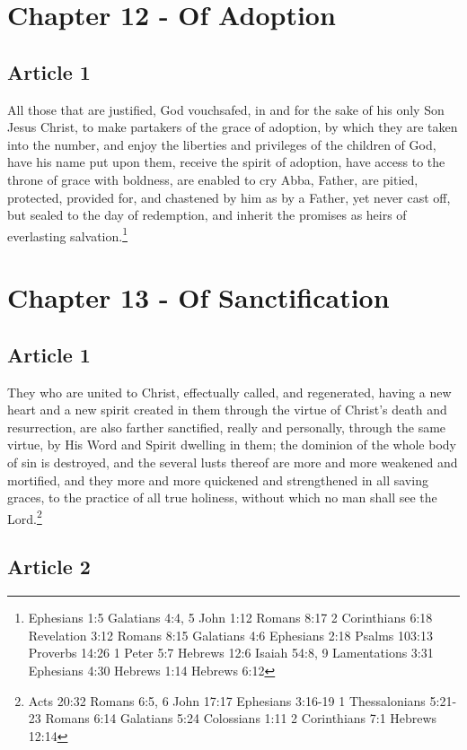 \documentclass[12pt,letterpaper]{book}
\begin{document}
\chapter{Chapter 12 - Of Adoption}
\section{Article 1}

All those that are justified, God vouchsafed, in and for the sake of his only Son Jesus Christ, to make partakers of the grace of adoption, by which they are taken into the number, and enjoy the liberties and privileges of the children of God, have his name put upon them, receive the spirit of adoption, have access to the throne of grace with boldness, are enabled to cry Abba, Father, are pitied, protected, provided for, and chastened by him as by a Father, yet never cast off, but sealed to the day of redemption, and inherit the promises as heirs of everlasting salvation.\footnote{Ephesians 1:5 Galatians 4:4, 5 John 1:12 Romans 8:17 2 Corinthians 6:18 Revelation 3:12 Romans 8:15 Galatians 4:6 Ephesians 2:18 Psalms 103:13 Proverbs 14:26 1 Peter 5:7 Hebrews 12:6 Isaiah 54:8, 9 Lamentations 3:31 Ephesians 4:30 Hebrews 1:14 Hebrews 6:12}

\chapter{Chapter 13 - Of Sanctification}
\section{Article 1}

They who are united to Christ, effectually called, and regenerated, having a new heart and a new spirit created in them through the virtue of Christ's death and resurrection, are also farther sanctified, really and personally, through the same virtue, by His Word and Spirit dwelling in them; the dominion of the whole body of sin is destroyed, and the several lusts thereof are more and more weakened and mortified, and they more and more quickened and strengthened in all saving graces, to the practice of all true holiness, without which no man shall see the Lord.\footnote{Acts 20:32 Romans 6:5, 6 John 17:17 Ephesians 3:16-19 1 Thessalonians 5:21-23 Romans 6:14 Galatians 5:24 Colossians 1:11 2 Corinthians 7:1 Hebrews 12:14}

\section{Article 2}
\end{document}

